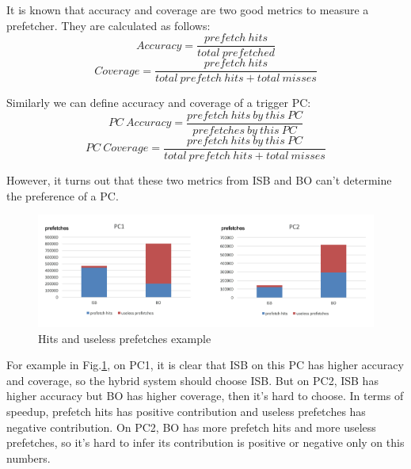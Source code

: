   It is known that accuracy and coverage are two good metrics to measure a prefetcher. They are calculated as follows:
  \begin{equation}
 Accuracy = \frac{prefetch\ hits}{total\  prefetched} 
 \end{equation}
  \begin{equation}
  Coverage = \frac{prefetch\ hits}{total\ prefetch\ hits + total\ misses}
  \end{equation}
  
  Similarly we can define accuracy and coverage of a trigger PC:
  \begin{equation}
  PC\ Accuracy = \frac{prefetch\ hits\ by\ this\ PC}{prefetches\ by\ this\ PC}
  \end{equation}
  \begin{equation}
  PC\ Coverage = \frac{prefetch\ hits\ by\ this\ PC}{total\ prefetch\ hits + total\ misses}
 \end{equation}
 
 However, it turns out that these two metrics from ISB and BO can't determine the preference of a PC. 
 
 \begin{figure}[ht!]
	\centering
	\includegraphics[width=1.0\textwidth]{images/metric.png}
	\caption{Hits and useless prefetches example}
	\label{fig:metric}
\end{figure}

For example in Fig.\ref{fig:metric}, on PC1, it is clear that ISB on this PC has higher accuracy and coverage, so the hybrid system should choose ISB. But on PC2, ISB has higher accuracy but BO has higher coverage, then it's hard to choose. 
In terms of speedup, prefetch hits has positive contribution and useless prefetches has negative contribution. 
On PC2, BO has more prefetch hits and more useless prefetches, so it's hard to infer its contribution is positive or negative only on this numbers. 
  
